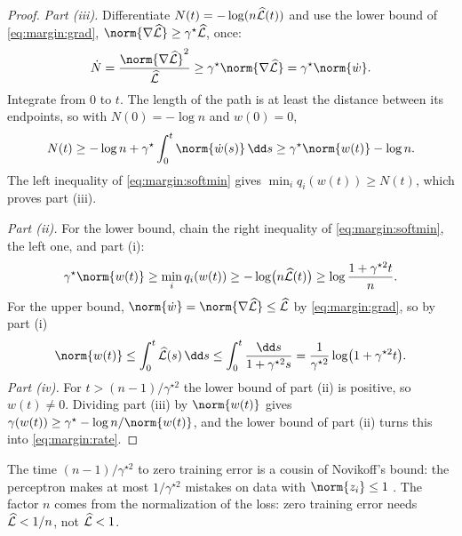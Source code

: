 \begin{refsection}
\begin{proof}
\emph{Part (iii).} Differentiate $N(t)=-\log(n\widehat{\mathcal{L}}(t))$ and use the lower bound of \eqref{eq:margin:grad}, $\norm{\nabla\Lhat}\ge\gamma^\star\Lhat$, once:
\[
  \dot N=\frac{\norm{\nabla\Lhat}^2}{\Lhat}\ge\gamma^\star\norm{\nabla\Lhat}=\gamma^\star\norm{\dot w}.
\]
Integrate from $0$ to $t$. The length of the path is at least the distance between its endpoints, so with $N(0)=-\log n$ and $w(0)=0$,
\begin{equation}\label{eq:margin:Ngrowth}
  N(t)\ge-\log n+\gamma^\star\int_0^t\norm{\dot w(s)}\,\dd s\ge\gamma^\star\norm{w(t)}-\log n .
\end{equation}
The left inequality of \eqref{eq:margin:softmin} gives $\min_iq_i(w(t))\ge N(t)$, which proves part (iii).

\emph{Part (ii).} For the lower bound, chain the right inequality of \eqref{eq:margin:softmin}, the left one, and part (i):
\[
  \gamma^\star\norm{w(t)}\ge\min_iq_i(w(t))\ge-\log\bigl(n\Lhat(t)\bigr)\ge\log\frac{1+\gamma^{\star2}t}n .
\]
For the upper bound, $\norm{\dot w}=\norm{\nabla\Lhat}\le\Lhat$ by \eqref{eq:margin:grad}, so by part (i)
\[
  \norm{w(t)}\le\int_0^t\Lhat(s)\,\dd s\le\int_0^t\frac{\dd s}{1+\gamma^{\star2}s}=\frac1{\gamma^{\star2}}\log\bigl(1+\gamma^{\star2}t\bigr).
\]
\emph{Part (iv).} For $t>(n-1)/\gamma^{\star2}$ the lower bound of part (ii) is positive, so $w(t)\ne0$. Dividing part (iii) by $\norm{w(t)}$ gives $\gamma(w(t))\ge\gamma^\star-\log n/\norm{w(t)}$, and the lower bound of part (ii) turns this into \eqref{eq:margin:rate}.
\end{proof}

The time $(n-1)/\gamma^{\star2}$ to zero training error is a cousin of Novikoff's bound: the perceptron makes at most $1/\gamma^{\star2}$ mistakes on data with $\norm{z_i}\le1$ \parencite{Novikoff1962}. The factor $n$ comes from the normalization of the loss: zero training error needs $\widehat{\mathcal{L}}<1/n$, not $\widehat{\mathcal{L}}<1$.



\end{refsection}
